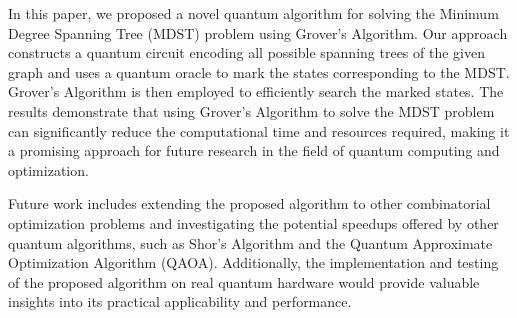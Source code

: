 In this paper, we proposed a novel quantum algorithm for solving the Minimum Degree Spanning Tree (MDST) problem using Grover's Algorithm. Our approach constructs a quantum circuit encoding all possible spanning trees of the given graph and uses a quantum oracle to mark the states corresponding to the MDST. Grover's Algorithm is then employed to efficiently search the marked states. The results demonstrate that using Grover's Algorithm to solve the MDST problem can significantly reduce the computational time and resources required, making it a promising approach for future research in the field of quantum computing and optimization.

Future work includes extending the proposed algorithm to other combinatorial optimization problems and investigating the potential speedups offered by other quantum algorithms, such as Shor's Algorithm and the Quantum Approximate Optimization Algorithm (QAOA). Additionally, the implementation and testing of the proposed algorithm on real quantum hardware would provide valuable insights into its practical applicability and performance.

